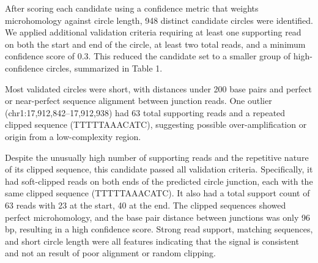 \documentclass[11pt, letterpaper]{article}
\begin{document}
After scoring each candidate using a confidence metric that weights microhomology against 
circle length, 948 distinct candidate circles were identified. We applied additional 
validation criteria requiring at least one supporting read on both the start and end of 
the circle, at least two total reads, and a minimum confidence score of 0.3. This reduced 
the candidate set to a smaller group of high-confidence circles, summarized in Table 1.

\begin{table}
    \centering
    \caption{Top 5 Validated microDNA Circles (Escaped for LaTeX)}
    \label{tab:validated-circles}
\end{table}
    
    
    

Most validated circles were short, with distances under 200 base pairs and 
perfect or near-perfect sequence alignment between junction reads. One outlier 
(chr1:17,912,842–17,912,938) had 63 total supporting reads and a repeated 
clipped sequence (TTTTTAAACATC), suggesting possible over-amplification or 
origin from a low-complexity region. 

Despite the unusually high number of supporting reads and the repetitive nature 
of its clipped sequence, this candidate passed all validation criteria. 
Specifically, it had soft-clipped reads on both ends of the predicted circle 
junction, each with the same clipped sequence (TTTTTAAACATC). It also had a total 
support count of 63 reads with 23 at the start, 40 at the end. The clipped sequences 
showed perfect microhomology, and the base pair distance between junctions was only 
96 bp, resulting in a high confidence score. Strong read support, matching sequences, 
and short circle length were all features indicating that the signal is consistent and 
not an result of poor alignment or random clipping.
\end{document}
